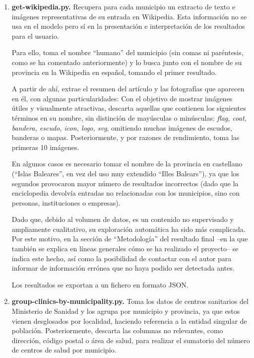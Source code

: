 \begin{enumerate}
    \item \textbf{get-wikipedia.py.} Recupera para cada municipio un extracto de texto e imágenes representativas de su entrada en Wikipedia. Esta información no se usa en el modelo pero sí en la presentación e interpretación de los resultados para el usuario.

    Para ello, toma el nombre ``humano'' del municipio (sin comas ni paréntesis, como se ha comentado anteriormente) y lo busca junto con el nombre de su provincia en la Wikipedia en español, tomando el primer resultado.
    
    A partir de ahí, extrae el resumen del artículo y las fotografías que aparecen en él, con algunas particularidades: Con el objetivo de mostrar imágenes útiles y visualmente atractivas, descarta aquellas que contienen los siguientes términos en su nombre, sin distinción de mayúsculas o minúsculas: \textit{flag, coat, bandera, escudo, icon, logo, svg}, omitiendo muchas imágenes de escudos, banderas o mapas. Posteriormente, y por razones de rendimiento, toma las primeras 10 imágenes.
    
    En algunos casos es necesario tomar el nombre de la provincia en castellano (``Islas Baleares'', en vez del uso muy extendido ``Illes Balears''), ya que los segundos provocaron mayor número de resultados incorrectos (dado que la enciclopedia devolvía entradas no relacionadas con los municipios, sino con personas, instituciones o empresas).
    
    Dado que, debido al volumen de datos, es un contenido no supervisado y ampliamente cualitativo, su exploración automática ha sido más complicada. Por este motivo, en la sección de ``Metodología'' del resultado final –en la que también se explica en líneas generales cómo se ha realizado el proyecto– se indica este hecho, así como la posibilidad de contactar con el autor para informar de información errónea que no haya podido ser detectada antes.
    
    Los resultados se exportan a un fichero en formato JSON.

    \item \textbf{group-clinics-by-municipality.py.} Toma los datos de centros sanitarios del Ministerio de Sanidad y los agrupa por municipio y provincia, ya que estos vienen desglosados por localidad, haciendo referencia a la entidad singular de población. Posteriormente, descarta las columnas no relevantes, como dirección, código postal o área de salud, para realizar el sumatorio del número de centros de salud por municipio.


\end{enumerate}
